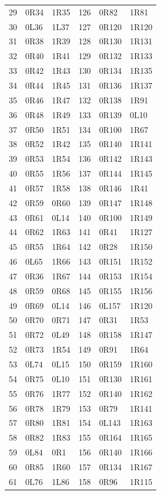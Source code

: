 \begin{longtable}{rll@{\qquad\qquad}rll}
29 & 0R34 & 1R35 & 126 & 0R82 & 1R81\\
30 & 0L36 & 1L37 & 127 & 0R120 & 1R120\\
31 & 0R38 & 1R39 & 128 & 0R130 & 1R131\\
32 & 0R40 & 1R41 & 129 & 0R132 & 1R133\\
33 & 0R42 & 1R43 & 130 & 0R134 & 1R135\\
34 & 0R44 & 1R45 & 131 & 0R136 & 1R137\\
35 & 0R46 & 1R47 & 132 & 0R138 & 1R91\\
36 & 0R48 & 1R49 & 133 & 0R139 & 0L10\\
37 & 0R50 & 1R51 & 134 & 0R100 & 1R67\\
38 & 0R52 & 1R42 & 135 & 0R140 & 1R141\\
39 & 0R53 & 1R54 & 136 & 0R142 & 1R143\\
40 & 0R55 & 1R56 & 137 & 0R144 & 1R145\\
41 & 0R57 & 1R58 & 138 & 0R146 & 1R41\\
42 & 0R59 & 0R60 & 139 & 0R147 & 1R148\\
43 & 0R61 & 0L14 & 140 & 0R100 & 1R149\\
44 & 0R62 & 1R63 & 141 & 0R41 & 1R127\\
45 & 0R55 & 1R64 & 142 & 0R28 & 1R150\\
46 & 0L65 & 1R66 & 143 & 0R151 & 1R152\\
47 & 0R36 & 1R67 & 144 & 0R153 & 1R154\\
48 & 0R59 & 0R68 & 145 & 0R155 & 1R156\\
49 & 0R69 & 0L14 & 146 & 0L157 & 1R120\\
50 & 0R70 & 0R71 & 147 & 0R31 & 1R53\\
51 & 0R72 & 0L49 & 148 & 0R158 & 1R147\\
52 & 0R73 & 1R54 & 149 & 0R91 & 1R64\\
53 & 0L74 & 0L15 & 150 & 0R159 & 1R160\\
54 & 0R75 & 0L10 & 151 & 0R130 & 1R161\\
55 & 0R76 & 1R77 & 152 & 0R140 & 1R162\\
56 & 0R78 & 1R79 & 153 & 0R79 & 1R141\\
57 & 0R80 & 1R81 & 154 & 0L143 & 1R163\\
58 & 0R82 & 1R83 & 155 & 0R164 & 1R165\\
59 & 0L84 & 0R1 & 156 & 0R140 & 1R166\\
60 & 0R85 & 1R60 & 157 & 0R134 & 1R167\\
61 & 0L76 & 1L86 & 158 & 0R96 & 1R115\\

\end{longtable}
